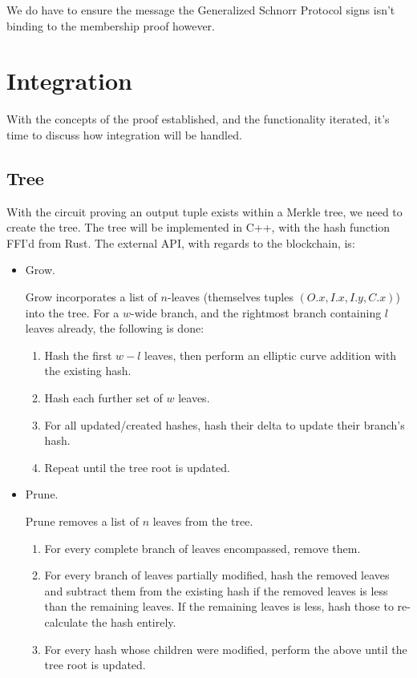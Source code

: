 \documentclass[]{article}
\begin{document}
We do have to ensure the message the Generalized Schnorr Protocol signs isn't binding to the membership proof however.

\newpage

\section{Integration}

With the concepts of the proof established, and the functionality iterated, it's time to discuss how integration will be handled.

\subsection{Tree}

With the circuit proving an output tuple exists within a Merkle tree, we need to create the tree. The tree will be implemented in C++, with the hash function FFI'd from Rust. The external API, with regards to the blockchain, is:

\begin{itemize}
  \item Grow.
  
  Grow incorporates a list of $n$-leaves (themselves tuples $(O.x, I.x, I.y, C.x)$) into the tree. For a $w$-wide branch, and the rightmost branch containing $l$ leaves already, the following is done:
  
  \begin{enumerate}
  	\item Hash the first $w - l$ leaves, then perform an elliptic curve addition with the existing hash.
  	\item Hash each further set of $w$ leaves.
  	\item For all updated/created hashes, hash their delta to update their branch's hash.
  	\item Repeat until the tree root is updated.
  \end{enumerate}

  \item Prune.
  
  Prune removes a list of $n$ leaves from the tree.
   
  \begin{enumerate}
   	\item For every complete branch of leaves encompassed, remove them.
   	\item For every branch of leaves partially modified, hash the removed leaves and subtract them from the existing hash if the removed leaves is less than the remaining leaves. If the remaining leaves is less, hash those to re-calculate the hash entirely.
   	\item For every hash whose children were modified, perform the above until the tree root is updated.
  \end{enumerate}
\end{itemize}
\end{document}
